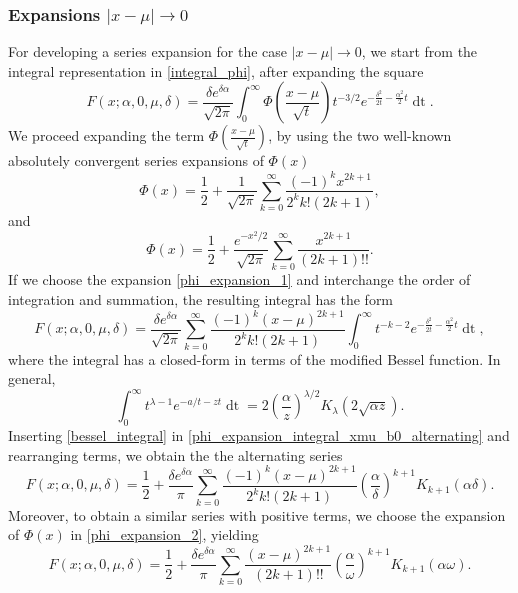 \documentclass[10pt,a4paper,oneside]{article}
\numberwithin{equation}{section}
\begin{document}
\subsubsection{Expansions $|x-\mu| \to 0$}
For developing a series expansion for the case $|x-\mu| \to 0$, we start from the integral representation in \eqref{integral_phi}, after expanding the square
\begin{equation}\label{integral_phi2}
F(x; \alpha, 0, \mu, \delta) = \frac{\delta e^{\delta \alpha}}{\sqrt{2\pi}} \int_0^{\infty} \Phi\left(\frac{x - \mu}{\sqrt{t}}\right) t^{-3/2} e^{-\frac{\delta^2}{2t} - \frac{\alpha^2}{2}t} \mathop{dt}.
\end{equation}
We proceed expanding the term $\Phi\left(\frac{x-\mu}{\sqrt{t}}\right)$, by using the two well-known absolutely convergent series expansions of $\Phi(x)$ \cite[\S 2]{Lebedev1972}
\begin{equation}\label{phi_expansion_1}
\Phi(x) = \frac{1}{2} + \frac{1}{\sqrt{2\pi}}\sum_{k=0}^{\infty} \frac{(-1)^k x^{2k + 1}}{2^k k! (2k+1)},
\end{equation}
and
\begin{equation}\label{phi_expansion_2}
\Phi(x) = \frac{1}{2} + \frac{e^{-x^2 / 2}}{\sqrt{2\pi}}\sum_{k=0}^{\infty} \frac{x^{2k+1}}{(2k + 1)!!}.
\end{equation}
If we choose the expansion \eqref{phi_expansion_1} and interchange the order of integration and summation, the resulting integral has the form
\begin{equation}\label{phi_expansion_integral_xmu_b0_alternating}
F(x; \alpha, 0, \mu, \delta) = \frac{\delta e^{\delta \alpha}}{\sqrt{2\pi}} \sum_{k=0}^{\infty} \frac{(-1)^k (x-\mu)^{2k + 1}}{2^k k! (2k + 1)}\int_0^{\infty} t^{-k-2} e^{-\frac{\delta^2}{2t} - \frac{\alpha^2}{2}t} \mathop{dt},
\end{equation}
where the integral has a closed-form in terms of the modified Bessel function. In general,
\begin{equation}\label{bessel_integral}
\int_0^{\infty} t^{\lambda - 1}e^{-a/t - zt} \mathop{dt} = 2\left(\frac{\alpha}{z}\right)^{\lambda/2} K_{\lambda}(2\sqrt{\alpha z}).
\end{equation}
Inserting \eqref{bessel_integral} in \eqref{phi_expansion_integral_xmu_b0_alternating} and rearranging terms, we obtain the the alternating series
\begin{equation}\label{expansion_xmu_b0_alternating}
F(x; \alpha, 0, \mu, \delta) = \frac{1}{2} + \frac{\delta e^{\delta \alpha}}{\pi}\sum_{k=0}^{\infty} \frac{(-1)^k (x-\mu)^{2k+1}}{2^k k! (2k + 1)} \left(\frac{\alpha}{\delta}\right)^{k+1}K_{k+1}(\alpha \delta).
\end{equation}
Moreover, to obtain a similar series with positive terms, we choose the expansion of $\Phi(x)$ in \eqref{phi_expansion_2}, yielding
\begin{equation}\label{expansion_xmu_b0_positive}
F(x; \alpha, 0, \mu, \delta) = \frac{1}{2} + \frac{\delta e^{\delta \alpha}} {\pi}\sum_{k=0}^{\infty} \frac{(x-\mu)^{2k+1}}{(2k +1)!!} \left(\frac{\alpha}{\omega}\right)^{k+1}K_{k+1}(\alpha \omega).
\end{equation}
\end{document}
